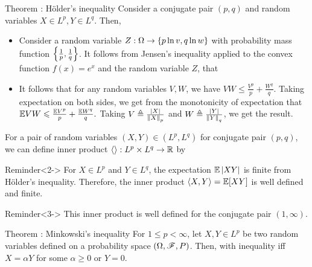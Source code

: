 \documentclass[12pt,aspectratio=169]{beamer}
\begin{document}
\begin{frame}
\begin{block}{Theorem : H\"older's inequality} 
Consider a conjugate pair $(p,q)$ and random variables $X \in L^p, Y \in L^q$. 
Then, 
\end{block}
\end{frame}
\begin{frame}
\begin{Proof}
\begin{itemize}
\item <1-> Consider a random variable $Z: \Omega \to \left\{p\ln v, q \ln w\right\}$ with probability mass function $\left\{\frac{1}{p}, \frac{1}{q}\right\}$. 
It follows from Jensen's inequality applied to the convex function $f(x) = e^x$ and the random variable $Z$, that 
\item <2-> It follows that for any random variables $V,W$, we have $VW \le \frac{V^p}{p} + \frac{W^q}{q}$. 
Taking expectation on both sides, 
we get from the monotonicity of expectation that  
$
\mathbb{E} VW \leqslant \frac{\mathbb{E} V^p}{p} +\frac{\mathbb{E} W^q}{q}.
$
Taking $V \triangleq \frac{\left\lvert X\right\rvert}{\left\lVert X\right\rVert_p}$ and $W \triangleq \frac{\left\lvert Y\right\rvert}{\left\lVert Y\right\rVert_q}$, we get the result.
\end{itemize}
\end{Proof}
\end{frame}
\begin{frame}
\begin{Definition}
For a pair of random variables $(X,Y) \in (L^p,L^q)$ for conjugate pair $(p,q)$, 
we can define inner product $\left\langle \right\rangle:L^p\times L^q \to \mathbb{R}$ by 
\end{Definition}
\begin{block}{Reminder}<2->
For $X \in L^p$ and $Y\in L^q$, the expectation $\mathbb{E}\left\lvert XY\right\rvert$ is finite from H\"older's inequality.
Therefore, the inner product $\left\langle X,Y\right\rangle = \mathbb{E}[XY]$ is well defined and finite.
\end{block}
\begin{block}{Reminder}<3->
This inner product is well defined for the conjugate pair $(1,\infty)$.
\end{block}
\end{frame}

\begin{frame}
\begin{block}{Theorem : Minkowski's inequality} 
For $1 \le p < \infty$, let $X,Y\in L^p$ be two random variables defined on a probability space $(\Omega, \mathscr{F}, P)$. 
Then, 
with inequality iff $X = \alpha Y$ for some $\alpha \ge 0$ or $Y = 0$. 
\end{block}
\end{frame}
\end{document}
